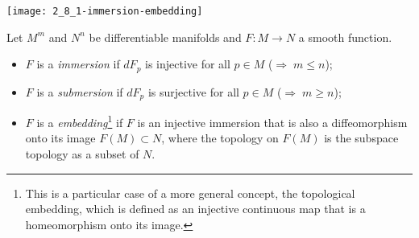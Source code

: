 \begin{marginfigure}
  \texttt{[image: 2\_8\_1-immersion-embedding]}
\end{marginfigure}
\begin{definition}
  Let $M^m$ and $N^n$ be differentiable manifolds and $F:M\to N$ a smooth function.
  \begin{itemize}
    \item $F$ is a \emph{immersion} if $dF_p$ is injective for all $p\in M$ ($\Rightarrow\; m\leq n$);
    \item $F$ is a \emph{submersion} if $dF_p$ is surjective for all $p\in M$ ($\Rightarrow\; m\geq n$);
    \item $F$ is a \emph{embedding}\footnote{This is a particular case of a more general concept, the topological embedding, which is defined as an injective continuous map that is a homeomorphism onto its image.} if $F$ is an injective immersion that is also a diffeomorphism onto its image $F(M)\subset N$, where the topology on $F(M)$ is the subspace topology as a subset of $N$.
  \end{itemize}
\end{definition}

